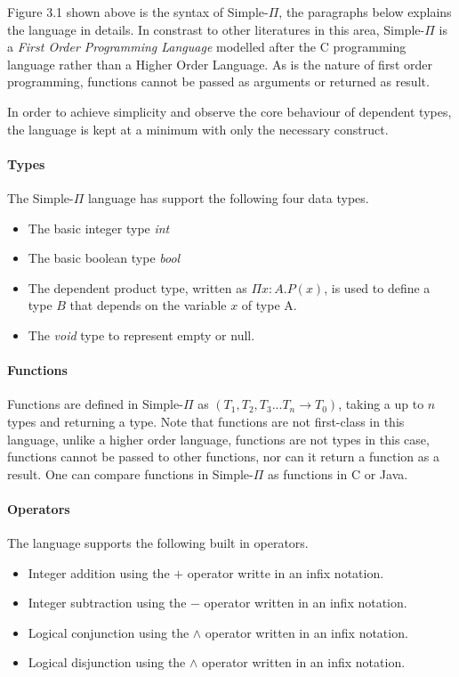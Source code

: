 \documentclass[a4paper,12pt]{report}
\begin{document}
\par
Figure 3.1 shown above is the syntax of Simple-$\Pi$, the paragraphs below 
explains the language in details. In constrast to other literatures in this area, 
Simple-$\Pi$ is a \textit{First Order Programming Language} \cite{FOL} modelled 
after the C programming language rather than a Higher Order Language. As is the 
nature of first order programming, functions cannot be passed as arguments or 
returned as result. 

\par
In order to achieve simplicity and observe the core behaviour of dependent 
types, the language is kept at a minimum with only the necessary construct. 

\paragraph{Types} The Simple-$\Pi$ language has support the following four data types. 
\begin{itemize}
  \item The basic integer type \textit{int}
  \item The basic boolean type \textit{bool}
  \item The dependent product type, written as $\Pi x: A.P(x)$, is used to 
  define a type $B$ that depends on the variable $x$ of type A.
  \item The \textit{void} type to represent empty or null.
\end{itemize}

\paragraph{Functions}
Functions are defined in Simple-$\Pi$ as $(T_1, T_2,T_3...T_n \longrightarrow T_0)$, 
taking a up to $n$ types and returning a type. Note that functions are 
not first-class in this language, unlike a higher order 
language, functions are not types in this case, functions cannot be passed to 
other functions, nor can it return a function as a result. One can compare 
functions in Simple-$\Pi$ as functions in C or Java. 

\paragraph{Operators}
The language supports the following built in operators.
\begin{itemize}
  \item Integer addition using the $+$ operator writte in an infix notation.
  \item Integer subtraction using the $-$ operator written in an infix notation.
  \item Logical conjunction using the $\wedge$ operator written in an infix 
  notation.
  \item Logical disjunction using the $\wedge$ operator written in an infix 
  notation.
\end{itemize}
\end{document}
